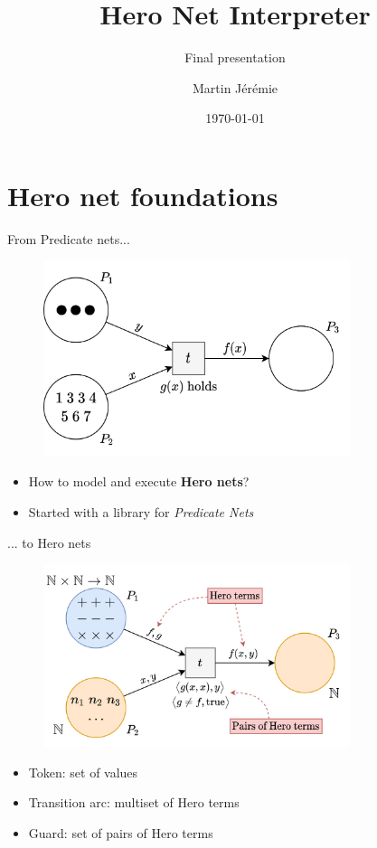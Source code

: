 \documentclass[10pt]{beamer}
\title{Hero Net Interpreter}
\subtitle{Final presentation}
\date{\today}
\author{Martin Jérémie}
\institute{University of Geneva}
\begin{document}
\maketitle

\section{Hero net foundations}

\begin{frame}[fragile]{From Predicate nets...}
    \begin{figure}
        \centering
        \includegraphics[width=0.8\textwidth]{01petri.png}
    \end{figure}
    \begin{itemize}
        \item How to model and execute \textbf{Hero nets}?
        \item Started with a library for \textit{Predicate Nets}
    \end{itemize}
\end{frame}

\begin{frame}[fragile]{... to Hero nets}
    \begin{figure}
        \centering
        \includegraphics[width=0.80\textwidth]{02heronet.png}
    \end{figure}
    \begin{itemize}
        \item Token: set of values
        \item Transition arc: multiset of Hero terms
        \item Guard: set of pairs of Hero terms
    \end{itemize}
\end{frame}
\end{document}
